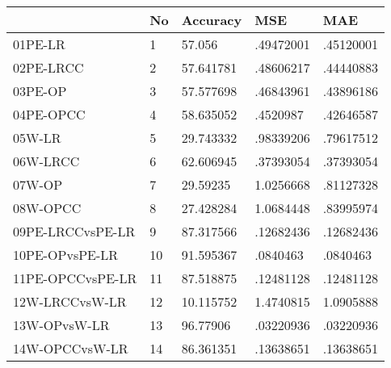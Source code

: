\begin{table}[htbp]
\begin{tabular}{|l|l|l|l|l|}\hline  
 & No  & Accuracy  & MSE  & MAE  \\ \hline  
01PE-LR & 1 & 57.056 & .49472001 & .45120001 \\ \hline 
02PE-LRCC & 2 & 57.641781 & .48606217 & .44440883 \\ \hline 
03PE-OP & 3 & 57.577698 & .46843961 & .43896186 \\ \hline 
04PE-OPCC & 4 & 58.635052 & .4520987 & .42646587 \\ \hline 
05W-LR & 5 & 29.743332 & .98339206 & .79617512 \\ \hline 
06W-LRCC & 6 & 62.606945 & .37393054 & .37393054 \\ \hline 
07W-OP & 7 & 29.59235 & 1.0256668 & .81127328 \\ \hline 
08W-OPCC & 8 & 27.428284 & 1.0684448 & .83995974 \\ \hline 
09PE-LRCCvsPE-LR & 9 & 87.317566 & .12682436 & .12682436 \\ \hline 
10PE-OPvsPE-LR & 10 & 91.595367 & .0840463 & .0840463 \\ \hline 
11PE-OPCCvsPE-LR & 11 & 87.518875 & .12481128 & .12481128 \\ \hline 
12W-LRCCvsW-LR & 12 & 10.115752 & 1.4740815 & 1.0905888 \\ \hline 
13W-OPvsW-LR & 13 & 96.77906 & .03220936 & .03220936 \\ \hline 
14W-OPCCvsW-LR & 14 & 86.361351 & .13638651 & .13638651 \\ \hline 
  \end{tabular}
\end{table}
